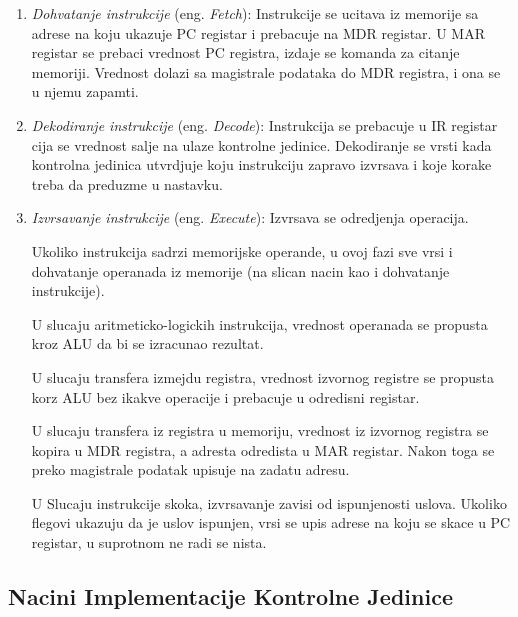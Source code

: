 \documentclass[12p,a4paper]{article}
\begin{document}
\begin{multicols}{2}
    \begin{enumerate}
        \itemsep0em
        \item \emph{Dohvatanje instrukcije} (eng. \emph{Fetch}): Instrukcije 
            se ucitava iz memorije sa adrese na koju ukazuje PC registar i 
            prebacuje na MDR registar. U MAR registar se prebaci vrednost PC
            registra, izdaje se komanda za citanje memoriji. Vrednost dolazi
            sa magistrale podataka do MDR registra, i ona se u njemu zapamti.
        \item \emph{Dekodiranje instrukcije} (eng. \emph{Decode}): Instrukcija
            se prebacuje u IR registar cija se vrednost salje na ulaze 
            kontrolne jedinice. Dekodiranje se vrsti kada kontrolna jedinica
            utvrdjuje koju instrukciju zapravo izvrsava i koje korake treba
            da preduzme u nastavku.
        \item \emph{Izvrsavanje instrukcije} (eng. \emph{Execute}): Izvrsava
            se odredjenja operacija. 

            Ukoliko instrukcija sadrzi memorijske 
            operande, u ovoj fazi sve vrsi i dohvatanje operanada iz memorije
            (na slican nacin kao i dohvatanje instrukcije). 

            U slucaju aritmeticko-logickih instrukcija, vrednost operanada se
            propusta kroz ALU da bi se izracunao rezultat. 

            U slucaju transfera izmejdu registra, vrednost izvornog registre 
            se propusta korz ALU bez ikakve operacije i prebacuje u odredisni 
            registar.

            U slucaju transfera iz registra u memoriju, vrednost iz izvornog
            registra se kopira u MDR registra, a adresta odredista u MAR 
            registar. Nakon toga se preko magistrale podatak upisuje na 
            zadatu adresu.

            U Slucaju instrukcije skoka, izvrsavanje zavisi od ispunjenosti 
            uslova. Ukoliko flegovi ukazuju da je uslov ispunjen, vrsi se upis
            adrese na koju se skace u PC registar, u suprotnom ne radi se 
            nista.
    \end{enumerate}

    \subsection{Nacini Implementacije Kontrolne Jedinice}


\end{multicols}
\end{document}
